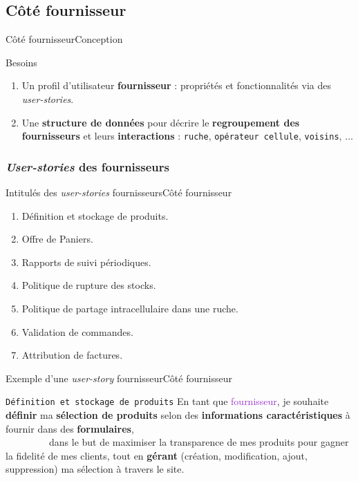 \documentclass[usenames,dvipsnames]{beamer}
\begin{document}
\subsection{Côté fournisseur}
\begin{frame}{Côté fournisseur}{Conception}
\begin{block}{Besoins}
\begin{enumerate}
  \item Un profil d'utilisateur \textbf{fournisseur} : propriétés et fonctionnalités via des \textit{user-stories}.
  \item Une \textbf{structure de données} pour décrire le \textbf{regroupement des fournisseurs} et leurs \textbf{interactions} : \texttt{ruche}, \texttt{opérateur cellule}, \texttt{voisins}, $\dots$
\end{enumerate}
\end{block}
\end{frame}

\subsubsection*{\protect\textit{User-stories} des fournisseurs}
\begin{frame}{Intitulés des \textit{user-stories} fournisseurs}{Côté fournisseur}
\begin{enumerate}
  \item Définition et stockage de produits.
  \item Offre de Paniers.
  \item Rapports de suivi périodiques.
  \item Politique de rupture des stocks.
  \item Politique de partage intracellulaire dans une ruche.
  \item Validation de commandes.
  \item Attribution de factures.
\end{enumerate}
\end{frame}

\begin{frame}{Exemple d'une \textit{user-story} fournisseur}{Côté fournisseur}
\begin{block}{\textcolor{Sepia}{\texttt{Définition et stockage de produits}}}
En tant que \textcolor{DarkOrchid}{fournisseur}, je souhaite {\color{BrickRed} \textbf{définir} ma \textbf{sélection de produits} selon des \textbf{informations caractéristiques} à fournir dans des \textbf{formulaires}},\\
~~~~~~~~~dans le but de {\color{OliveGreen}maximiser la transparence de mes produits pour gagner la fidelité de mes clients, tout en \textbf{gérant} (création, modification, ajout, suppression) ma sélection à travers le site}.
\end{block}
\end{frame}
\end{document}
